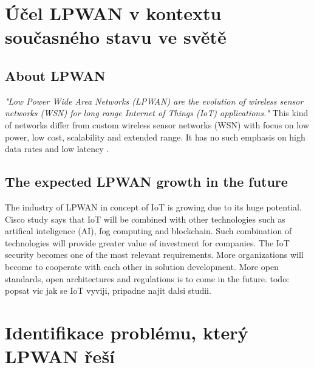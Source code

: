 \chapter{Účel LPWAN v kontextu současného stavu ve světě}

\section{About LPWAN}
\textit{"Low Power Wide Area Networks (LPWAN) are the
evolution of wireless sensor networks (WSN) for long
range Internet of Things (IoT) applications."} \cite{MURS Band for LPWAN Applications}
This kind of networks differ from custom wireless sensor networks (WSN) with focus on low power, low cost, scalability and extended range.
It has no such emphasis on high data rates and low latency \cite{MURS Band for LPWAN Applications}.


\section{The expected LPWAN growth in the future}
The industry of LPWAN in concept of IoT is growing due to its huge potential.
Cisco study \cite{IoT cisco study} says that IoT will be combined with other technologies such as artifical inteligence (AI), fog computing and blockchain. Such combination of technologies will provide greater value of investment for companies. 
The IoT security becomes one of the most relevant requirements.
More organizations will become to cooperate with each other in solution development.
More open standards, open architectures and regulations is to come in the future.
todo: popsat vic jak se IoT vyviji, pripadne najit dalsi studii.

















\chapter{Identifikace problému, který LPWAN řeší}